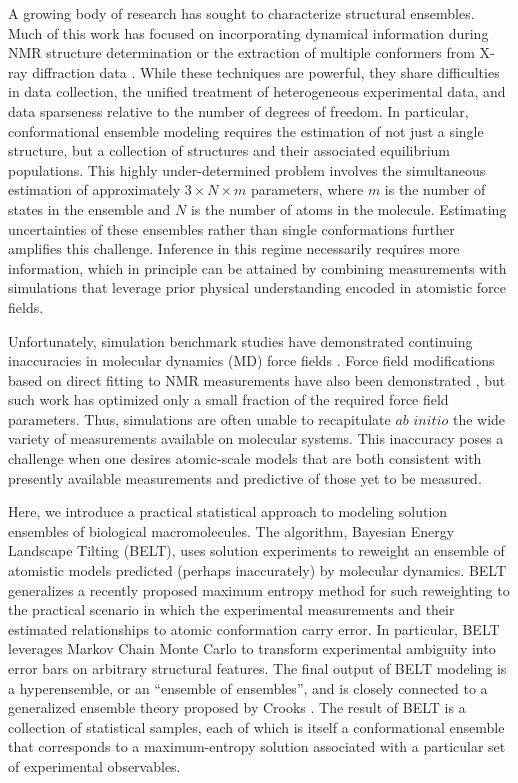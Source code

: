 \documentclass[journal=jacsat,manuscript=article]{achemso}
\begin{document}
A growing body of research has sought to characterize structural ensembles.  Much of this work has focused on incorporating dynamical information during NMR structure determination  \cite{lindorff2005simultaneous, lange2008recognition} or the extraction of multiple conformers from X-ray diffraction data  \cite{depristo2004heterogeneity, lang2010automated}.  While these techniques are powerful, they share difficulties in data collection, the unified treatment of heterogeneous experimental data, and data sparseness relative to the number of degrees of freedom.  In particular, conformational ensemble modeling requires the estimation of not just a single structure, but a collection of structures and their associated equilibrium populations.  This highly under-determined problem involves the simultaneous estimation of approximately $3 \times N \times m$ parameters, where $m$ is the number of states in the ensemble and $N$ is the number of atoms in the molecule. Estimating uncertainties of these ensembles rather than single conformations further amplifies this challenge.  Inference in this regime necessarily requires more information, which in principle can be attained by combining measurements with simulations that leverage prior physical understanding encoded in atomistic force fields. 

Unfortunately, simulation benchmark studies have demonstrated continuing inaccuracies in molecular dynamics (MD) force fields \cite{best2008, lindorff2012systematic, beauchamp2012protein}.  Force field modifications based on direct fitting to NMR measurements have also been demonstrated \cite{li2011iterative, best2012optimization, nerenberg2011}, but such work has optimized only a small fraction of the required force field parameters.  Thus, simulations are often unable to recapitulate $ab$ $initio$ the wide variety of measurements available on molecular systems.  This inaccuracy poses a challenge when one desires atomic-scale models that are both consistent with presently available measurements and predictive of those yet to be measured.  

Here, we introduce a practical statistical approach to modeling solution ensembles of biological macromolecules.  The algorithm, Bayesian Energy Landscape Tilting (BELT), uses solution experiments to reweight an ensemble of atomistic models predicted (perhaps inaccurately) by molecular dynamics.  BELT generalizes a recently proposed maximum entropy method for such reweighting \cite{chodera2012} to the practical scenario in which the experimental measurements and their estimated relationships to atomic conformation carry error. In particular, BELT leverages Markov Chain Monte Carlo \cite{patil2010pymc} to transform experimental ambiguity into error bars on arbitrary structural features. The final output of BELT modeling is a hyperensemble, or an ``ensemble of ensembles'', and is closely connected to a generalized ensemble theory proposed by Crooks \cite{crooks2007beyond}. The result of BELT is a collection of statistical samples, each of which is itself a conformational ensemble that corresponds to a maximum-entropy solution associated with a particular set of experimental observables. 
\end{document}
